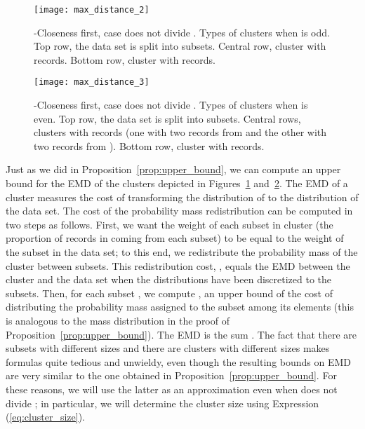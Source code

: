 \documentclass[10pt,journal,compsoc]{IEEEtran}
\theoremstyle{definition}
\theoremstyle{plain}
\begin{document}
\begin{figure}[!t]
	\begin{centering}
\texttt{[image: max\_distance\_2]}
		
		\par\end{centering}
\protect\caption{-Closeness first, case  does not divide . Types of clusters when  is odd. Top row, the data set is split
		into  subsets. Central row, cluster with  records. 
Bottom row, cluster with  records.\label{fig:types_of_clusters_1}}
	
	
\end{figure}


\begin{figure}[!t]
	\begin{centering}
\texttt{[image: max\_distance\_3]}
		
		\par\end{centering}
	\hfil
\protect\caption{-Closeness first, case  does not divide . Types of clusters when  is even. Top row, the data set is split
		into  subsets. Central rows, clusters with  records
		(one with two records from  and the other with two records
		from ). Bottom row, cluster with  records.\label{fig:types_of_clusters_2}}
\end{figure}


Just as we did in Proposition~\ref{prop:upper_bound},
we can compute an upper bound for the EMD of the clusters depicted
in Figures~\ref{fig:types_of_clusters_1} and~\ref{fig:types_of_clusters_2}.
The EMD of a cluster  measures the cost of transforming the distribution
of  to the distribution of the data set. The cost
of the probability mass redistribution can be computed in two steps as 
follows.
First, we want the weight of each subset  in cluster
 (the proportion of records in  coming from each subset) to
be equal to the weight of the subset in the data set; 
to this end, we redistribute
the probability mass of the cluster between subsets. 
This redistribution cost, , equals
the EMD between the cluster and the data set when the 
distributions have been discretized to the subsets. 
Then, for each subset , 
we compute , an 
upper bound of the cost of distributing the probability
mass  assigned to the subset among its elements
(this is analogous to the mass distribution 
in the proof of Proposition~\ref{prop:upper_bound}). 
The EMD is the sum . 
The fact that there are subsets with different sizes and there
are clusters with different sizes makes formulas 
quite tedious and unwieldy, even though the resulting bounds
on EMD are very similar to the one obtained in
Proposition~\ref{prop:upper_bound}. For these reasons, 
we will use the latter as an approximation even when 
does not divide ; in particular, 
we will determine the cluster size using Expression (\ref{eq:cluster_size}).
\end{document}
